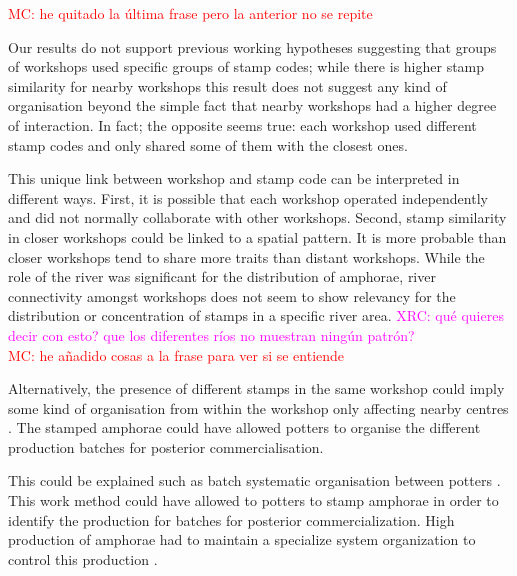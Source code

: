 \documentclass[review]{elsarticle}
\newcommand{\memo}[2]{\textcolor{#1}{#2}}
\newcommand{\maria}[1]{\memo{red}{MC: #1\\}}
\newcommand{\xavi}[1]{\memo{magenta}{XRC: #1\\}}
\begin{document}
\maria{he quitado la última frase pero la anterior no se repite}

Our results do not support previous working hypotheses suggesting that groups of workshops used specific groups of stamp codes; while there is higher stamp similarity for nearby workshops this result does not suggest any kind of organisation beyond the simple fact that nearby workshops had a higher degree of interaction. In fact; the opposite seems true: each workshop used different stamp codes and only shared some of them with the closest ones. 



This unique link between workshop and stamp code can be interpreted in different ways. First, it is possible that each workshop operated independently and did not normally collaborate with other workshops.  Second, stamp similarity in closer workshops could be linked to a spatial pattern. It is more probable than closer workshops tend to share more traits than distant workshops. While the role of the river was significant for the distribution of amphorae, river connectivity amongst workshops does not seem to show relevancy for the distribution or concentration of stamps in a specific river area.
\xavi{qué quieres decir con esto? que los diferentes ríos no muestran ningún patrón?}
\maria{he añadido cosas a la frase para ver si se entiende}

Alternatively, the presence of different stamps in the same workshop could imply some kind of organisation from within the workshop only affecting nearby centres \citep{juanmorostesis}. The stamped amphorae could have allowed potters to organise the different production batches for posterior commercialisation.


This could be explained such as batch systematic organisation between potters \citep{juanmorostesis}. This work method could have allowed to potters to stamp amphorae in order to identify the production for batches for posterior commercialization. High production of amphorae had to maintain a specialize system organization to control this production \citep[104]{juanmorostesis}.
\end{document}
